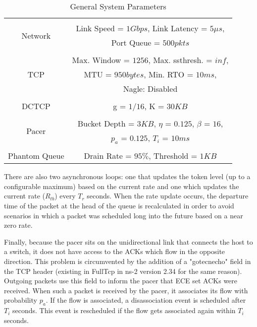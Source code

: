 \documentclass[10pt,conference,compsocconf]{IEEEtran}
\begin{document}
\begin{table}[h]
    \centering
    \begin{tabular}{c|c}
    \hline
    \\
    \multirow{2}{*}{Network}
        & Link Speed = $1Gbps$, Link Latency = $5\mu s$, \\
        & Port Queue = $500pkts$  \\[3pt]
    \hline
    \\
    \multirow{3}{*}{TCP}
        & Max. Window = $1256$, Max. ssthresh. = $inf$, \\
        & MTU = $950bytes$, Min. RTO = $10ms$, \\
        & Nagle: Disabled \\[3pt]
    \hline
    \\
    DCTCP & g = $1/16$, K = $30KB$\\[3pt]
    \hline
    \\
    \multirow{2}{*}{Pacer}
        & Bucket Depth = $3KB$, $\eta$ = $0.125$, $\beta$ = $16$, \\
        & $p_a$ = $0.125$, $T_i$ = $10ms$  \\[3pt]
    \hline
    \\
    Phantom Queue & Drain Rate = $95\%$, Threshold = $1KB$\\[3pt]
    \hline
    \end{tabular}
    \caption{General System Parameters}
    \label{tab:parameters}
\end{table}

There are also two asynchronous loops: one that updates the token level (up to a configurable maximum) based on the current rate and one which updates the current rate ($R_{tb}$) every $T_r$ seconds. When the rate update occurs, the departure time of the packet at the head of the queue is recalculated in order to avoid scenarios in which a packet was scheduled long into the future based on a near zero rate.

Finally, because the pacer sits on the unidirectional link that connects the host to a switch, it does not have access to the ACKs which flow in the opposite direction. This problem is circumvented by the addition of a "gotecnecho" field in the TCP header (existing in FullTcp in ns-2 version 2.34 \cite{CODE} for the same reason). Outgoing packets use this field to inform the pacer that ECE set ACKs were received. When such a packet is received by the pacer, it associates its flow with probability $p_a$. If the flow is associated, a disassociation event is scheduled after $T_i$ seconds. This event is rescheduled if the flow gets associated again within $T_i$ seconds.
\end{document}
